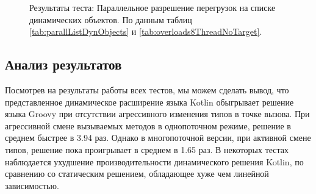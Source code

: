 \begin{figure}
\caption{\label{graph:parallListDynObjectsByArgs}Результаты теста: Параллельное разрешение перегрузок на списке динамических объектов. По данным таблиц \ref{tab:parallListDynObjects} и \ref{tab:overloads8ThreadNoTarget}.}
\end{figure}


\subsection{Анализ результатов}

Посмотрев на результаты работы всех тестов, мы можем сделать вывод, что представленное динамическое расширение языка Kotlin обыгрывает решение языка Groovy при отсутствии агрессивного изменения типов в точке вызова. При агрессивной смене вызываемых методов в однопоточном режиме, решение в среднем быстрее в 3.94 раз. Однако в многопоточной версии, при активной смене типов, решение пока проигрывает в среднем в 1.65 раз. В некоторых тестах наблюдается ухудшение производительности динамического решения Kotlin, по сравнению со статическим решением, обладающее хуже чем линейной зависимостью. 